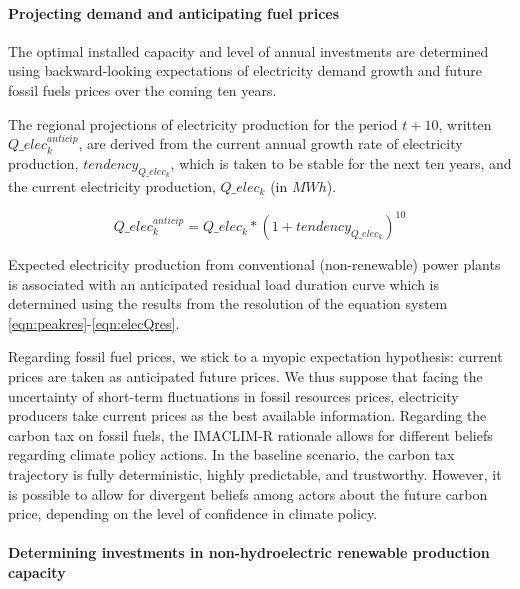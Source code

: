\paragraph{Projecting demand and anticipating fuel prices}

The optimal installed capacity and level of annual investments are determined using backward-looking expectations of electricity demand growth and  future fossil fuels prices over the coming ten years.

The regional projections of electricity production for the period $t+10$, written $Q\_elec_k^{anticip}$, are derived from the current annual growth rate of electricity production, $tendency_{Q\_elec_k}$, which is taken to be stable for the next ten years, and the current electricity production, $Q\_elec_k$ (in $MWh$).

\begin{dmath}
    Q\_elec_k^{anticip} = Q\_elec_k * \left( 1 + tendency_{Q\_elec_k}\right) ^{10}
    \label{eqn:elecQAnticip}
\end{dmath}

Expected electricity production from conventional (non-renewable) power plants is associated with an anticipated residual load duration curve which is determined using the results from the resolution of the equation system \ref{eqn:peakres}-\ref{eqn:elecQres}.

Regarding fossil fuel prices, we stick to a myopic expectation hypothesis: current prices are taken as anticipated future prices. We thus suppose that facing the uncertainty of short-term fluctuations in fossil resources prices, electricity producers take current prices as the best available information. 
Regarding the carbon tax on fossil fuels, the IMACLIM-R rationale allows for different beliefs regarding climate policy actions. In the baseline scenario, the carbon tax trajectory is fully deterministic, highly predictable, and trustworthy. However, it is possible to allow for divergent beliefs among actors about the future carbon price, depending on the level of confidence in climate policy.

\paragraph{Determining investments in non-hydroelectric renewable production capacity}

